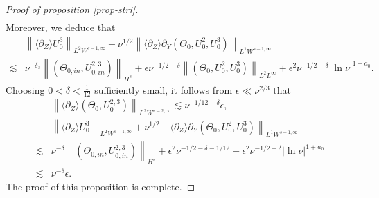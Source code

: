 \documentclass[12pt]{article}
\def\red#1{\textcolor{red}{#1}}
\newcommand{\wtb}{\langle\partial_Z\rangle }
\newcommand{\nm}[2]{\left\| #1 \right\| _{#2} }
\numberwithin{equation}{section}
\begin{document}
\begin{proof}[Proof of proposition \ref{prop-stri}]
\begin{align*}
	\end{align*}
    Moreover, we deduce that
    \begin{align*}
		~& \left\| \wtb U_0^{3} \right \|_{L^2 W^{s-1,\infty}} + \nu^{1/2} \nm{\wtb \partial_Y (\Theta_0, U_0^2,U_0^3)}{L^1 W^{s-1,\infty}}  \\
		\lesssim &  \nu ^{-\delta_3} \left \|  ( \Theta_{0,in},U_{0,in}^{2,3})  \right \| _{H^s}+ \epsilon \nu^{-1/2-\delta} \nm{ (\Theta_0, U_0^2,U_0^3)}{L^{2} L^{\infty}} +\epsilon^2 \nu^{-1/2-\delta}  | \ln{\nu}|^{1+a_0}.
	\end{align*}
	Choosing $0<\delta < \frac{1}{12}$ sufficiently small, it follows from $\epsilon \ll \nu^{2/3}$ that %
	\begin{align*}
		~&\left\| \wtb (\Theta_0,U_0^{2,3}) \right \|_{L^2 W^{s-2,\infty}} \lesssim \nu^{-1/12 -\delta}  \epsilon, \\
		~& \left\| \wtb U_0^{3} \right \|_{L^2 W^{s-1,\infty}} + \nu^{1/2} \nm{\wtb \partial_Y (\Theta_0, U_0^2,U_0^3)}{L^1 W^{s-1,\infty}}\\
        \lesssim &  \nu ^{-\delta} \left \|  ( \Theta_{0,in},U_{0,in}^{2,3})  \right \| _{H^s}+ \epsilon^2 \nu^{-1/2-\delta-1/12} +\epsilon^2 \nu^{-1/2-\delta}  | \ln{\nu}|^{1+a_0} \\
        \lesssim & \nu^{-\delta} \epsilon.
	\end{align*}
    The proof of this proposition is complete.
	\end{proof}
	
	
\end{document}
